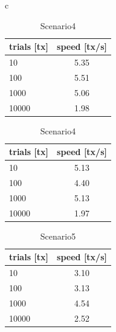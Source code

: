 \documentclass[a4paper, oneside]{discothesis}
\begin{document}
\begin{table}[htbp]
    \begin{center}
        \begin{tabular}{c}

            \begin{minipage}{0.5\hsize}
                \begin{center}
                    \caption{Scenario3}
                    \begin{tabular}{|l|c|} \hline
                        trials [tx] & speed [tx/s]\\ \hline \hline
                        10 & 5.35 \\
                        100 & 5.51 \\
                        1000 & 5.06 \\
                        10000 & 1.98 \\ \hline
                    \end{tabular}
                \end{center}
            \end{minipage}

            \begin{minipage}{0.5\hsize}
                \begin{center}
                    \caption{Scenario4}
                    \begin{tabular}{|l|c|} \hline
                        trials [tx] & speed [tx/s]\\ \hline \hline
                        10 & 5.13 \\
                        100 & 4.40 \\
                        1000 & 5.13 \\
                        10000 & 1.97  \\ \hline
                    \end{tabular}
                \end{center}
            \end{minipage}

        \end{tabular}
    \end{center}
\end{table}

\begin{table}[htb]
  \begin{center}
    \caption{Scenario5}
    \begin{tabular}{|l|c|} \hline
        trials [tx] & speed [tx/s]\\ \hline \hline
        10 & 3.10 \\
        100 & 3.13 \\
        1000 & 4.54 \\
        10000 & 2.52 \\ \hline
    \end{tabular}
  \end{center}
\end{table}
\end{document}
